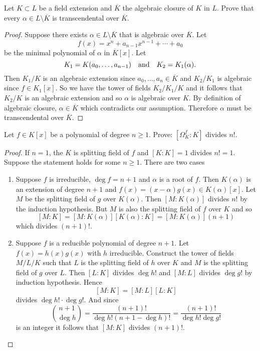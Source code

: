     \begin{ex}{21.32}
        Let $K\subset L$ be a field extension and $\overline{K}$ the algebraic closure of $K$ in $L$. 
        Prove that every $\alpha\in L\setminus\overline{K}$ is transcendental over $\overline{K}$.
    \end{ex}
    \begin{proof}
        Suppose there exists $\alpha\in L\setminus\overline{K}$ that is algebraic over $\overline{K}$.
        Let
        $$f(x)=x^n+a_{n-1}x^{n-1}+\cdots+a_0$$
        be the minimal polynomial of $\alpha$ in $\overline{K}[x]$. Let 
        $$K_1=K(a_0,\dots,a_{n-1})\quad\text{and}\quad K_2=K_1(\alpha).$$
        Then $K_1/K$ is an algebraic extension since $a_0,\dots,a_n\in\overline{K}$ and $K_2/K_1$ is algebraic since $f\in K_1[x]$.
        So we have the tower of fields $K_2/K_1/K$  and it follows that $K_2/K$ is an algebraic extension and so $\alpha$ is algebraic over $K$.
        By definition of algebraic closure, $\alpha\in\overline{K}$ which contradicts our assumption. 
        Therefore $\alpha$ must be transcendental over $\overline{K}$.
    \end{proof}

    \begin{ex}{21.35}
        Let $f\in K[x]$ be a polynomial of degree $n\geq 1$. Prove: $[\Omega_K^f:K]$ divides $n!$. 
    \end{ex}
    \begin{proof}
        If $n=1$, the $K$ is splitting field of $f$ and $[K:K]=1$ divides $n!=1$.
        Suppose the statement holds for some $n\geq 1$. There are two cases
        \begin{enumerate}
            \item Suppose $f$ is irreducible, $\deg f = n+1$ and $\alpha$ is a root of $f$.
                Then $K(\alpha)$ is an extension of degree $n+1$ and $f(x)=(x-\alpha)g(x)\in K(\alpha)[x]$.
                Let $M$ be the splitting field of $g$ over $K(\alpha)$. 
                Then $[M:K(\alpha)]$ divides $n!$ by the induction hypothesis.
                But $M$ is also the splitting field of $f$ over $K$ and so
                $$[M:K]=[M:K(\alpha)][K(\alpha):K]=[M:K(\alpha)](n+1)$$
                which divides $(n+1)!$.
            \item Suppose $f$ is a reducible polynomial of degree $n+1$. Let $f(x)=h(x)g(x)$ with $h$ irreducible. 
                Construct the tower of fields $M/L/K$ such that $L$ is the splitting field of $h$ over $K$ and $M$ is the splitting field of $g$ over $L$.
                Then $[L:K]$ divides $\deg h!$ and $[M:L]$ divides $\deg g!$ by induction hypothesis. 
                Hence 
                $$[M:K]=[M:L][L:K]$$ 
                divides $\deg h!\cdot\deg g!$.
                And since 
                $${n+1\choose \deg h}=\frac{(n+1)!}{\deg h!(n+1-\deg h)!}=\frac{(n+1)!}{\deg h!\deg g!}$$
                is an integer it follows that $[M:K]$ divides $(n+1)!$.
        \end{enumerate}
    \end{proof}

